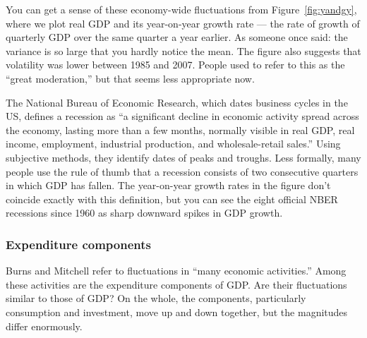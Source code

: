 \documentclass[letterpaper,12pt]{article}
\begin{document}
You can get a sense of these economy-wide fluctuations 
from Figure~\ref{fig:yandgy},
where we plot real GDP and its year-on-year growth rate ---
the rate of growth of quarterly GDP over the same quarter a year earlier.
As someone once said:  the variance is so large that you hardly notice the mean.  
The figure also suggests that volatility was lower between 1985
and 2007.
People used to refer to this as the ``great moderation,''
but that seems less appropriate now.

The National Bureau of Economic Research, 
which dates business cycles in the US, 
defines a recession as ``a significant decline 
in economic activity spread across the economy, 
lasting more than a few months, normally visible in real GDP, 
real income, employment, industrial production, 
and wholesale-retail sales.'' 
Using subjective methods, they identify dates of peaks and troughs.
Less formally, many people use the rule of thumb 
that a recession consists of two consecutive quarters
in which GDP has fallen.
The year-on-year growth rates in the figure don't coincide exactly
with this definition, but you can see the eight official NBER 
recessions since 1960 as sharp downward spikes in GDP growth.

%
%



\subsubsection*{Expenditure components}

Burns and Mitchell refer to fluctuations in
``many economic activities.''
Among these activities are the expenditure
components of GDP.
Are their fluctuations similar to those of GDP?
On the whole, the components, particularly consumption and investment,
move up and down together, but the magnitudes differ enormously.
\end{document}
